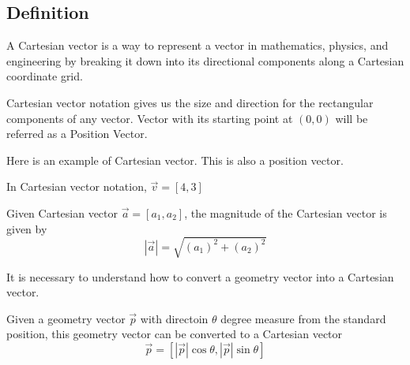 \subsection{Definition}
\begin{definition}
    A Cartesian vector is a way to represent a vector in mathematics, physics, and engineering by breaking it down into its directional components along a Cartesian coordinate grid. 
\end{definition}

Cartesian vector notation gives us the size and direction for the rectangular components of any vector. 
Vector with its starting point at $(0, 0)$ will be referred as a Position Vector. 

\begin{example}
    Here is an example of Cartesian vector. This is also a position vector. \\
    \begin{center}
    \end{center}

    In Cartesian vector notation, $\vec{v} = \left[4, 3\right]$
\end{example}



\begin{definition}
    Given Cartesian vector $\vec{a} = \left[a_1, a_2\right]$, the magnitude of the Cartesian vector is given by 
    $$\left|\vec{a}\right| = \sqrt{
        (a_1)^2 + (a_2)^2
    }$$
\end{definition}

It is necessary to understand how to convert a geometry vector into a Cartesian vector. 

Given a geometry vector $\vec{p}$ with directoin $\theta$ degree measure from the standard position, 
this geometry vector can be converted to a Cartesian vector 
$$\vec{p} = \left[\left|\vec{p}\right|\cos \theta, \left|\vec{p}\right|\sin \theta\right]$$

